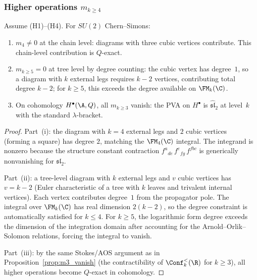 \subsubsection{Higher operations $m_{k \geq 4}$}

\begin{proposition}
Assume \textrm{(H1)--(H4)}. For $SU(2)$ Chern--Simons:
\begin{enumerate}[label=\textup{(\roman*)}]
\item $m_4 \neq 0$ at the chain level: diagrams with three cubic
 vertices contribute. This chain-level contribution is $Q$-exact.
\item $m_{k \geq 5} = 0$ at tree level by degree counting: the
 cubic vertex has degree~$1$, so a diagram with $k$ external legs
 requires $k-2$ vertices, contributing total degree $k-2$;
 for $k \geq 5$, this exceeds the degree available on
 $\FM_k(\C)$.
\item On cohomology $H^\bullet(\A, Q)$, all $m_{k \geq 3}$
 vanish: the PVA on $H^\bullet$ is
 $\widehat{\mathfrak{sl}}_2$ at level~$k$ with the standard
 $\lambda$-bracket.
\end{enumerate}
\end{proposition}

\begin{proof}
Part~(i): the diagram with $k=4$ external legs and $2$ cubic
vertices (forming a square) has degree $2$, matching the
$\FM_4(\C)$ integral. The integrand is nonzero because the
structure constant contraction
$f^{a}{}_{de}\, f^{e}{}_{fg}\, f^{fbc}$ is generically
nonvanishing for $\mathfrak{sl}_2$.

Part~(ii): a tree-level diagram with $k$ external legs and $v$
cubic vertices has $v = k - 2$ (Euler characteristic of a tree
with $k$ leaves and trivalent internal vertices). Each vertex
contributes degree~$1$ from the propagator pole. The integral
over $\FM_k(\C)$ has real dimension $2(k-2)$, so the degree
constraint is automatically satisfied for $k \leq 4$. For
$k \geq 5$, the logarithmic form degree exceeds the dimension
of the integration domain after accounting for the
Arnold--Orlik--Solomon relations, forcing the integral to vanish.

Part~(iii): by the same Stokes/AOS argument as in
Proposition~\ref{prop:m3_vanish} (the contractibility of
$\Conf_k^{<}(\R)$ for $k \geq 3$), all higher operations become
$Q$-exact in cohomology.
\end{proof}

